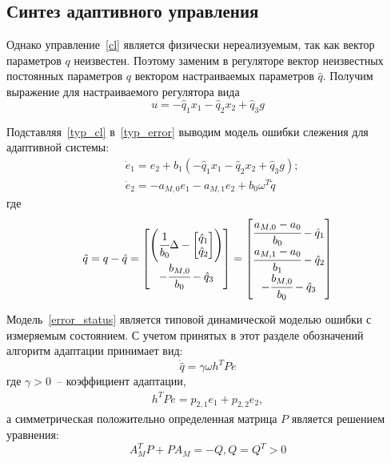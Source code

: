\subsection{Синтез адаптивного управления}

Однако управление~\ref{cl} является физически нереализуемым, так как вектор параметров $q$ неизвестен. Поэтому заменим в регуляторе вектор неизвестных постоянных параметров $q$ вектором настраиваемых параметров $\hat{q}$. Получим выражение для настраиваемого регулятора вида
\begin{equation}\label{typ_cl}
	u = - \hat{q}_1 x_1  - \hat{q}_2 x_2 +  \hat{q}_3 g
\end{equation}

Подставляя~\ref{typ_cl} в~\ref{typ_error} выводим модель ошибки слежения для адаптивной системы:
\begin{align}\label{error_status}
	&\dot e_1 = e_2 + b_1 (- \hat{q}_1 x_1  - \hat{q}_2 x_2 +  \hat{q}_3 g);\\
	&\dot e_2 = -a_{M,0} e_1 - a_{M,1} e_2 + b_0 \omega^T \tilde{q}
\end{align}
где 
\begin{align}
	\tilde{q} = q - \hat{q} =
	\begin{bmatrix}
		\left(\cfrac{1}{b_0} \Delta -
		\begin{bmatrix}
		\hat{q}_1\\
		\hat{q}_2
		\end{bmatrix}
		\right)\\
		-\cfrac{b_{M,0}}{b_0} - \hat{q}_3
	\end{bmatrix}
	=
	\begin{bmatrix}
		\cfrac{a_{M,0} - a_0}{b_0} - \hat{q}_1\\
		\cfrac{a_{M,1} - a_0}{b_1} - \hat{q}_2\\
		-\cfrac{b_{M,0}}{b_0} - \hat{q}_3
	\end{bmatrix}
\end{align}

Модель~\ref{error_status} является типовой динамической моделью ошибки с измеряемым состоянием. С учетом принятых в этот разделе обозначений  алгоритм адаптации принимает вид:
\begin{equation}
	\dot{\hat{q}} = \gamma \omega h^T P e
\end{equation}
где $\gamma > 0$~-- коэффициент адаптации,
\begin{align}
	h^T P e = p_{2,1} e_1 + p_{2,2} e_2,
\end{align}
а симметрическая положительно определенная матрица $P$ является решением уравнения:
\begin{equation}\label{sylv_err}
	A_{M}^T P + P A_{M} = -Q, Q = Q^T > 0
\end{equation}

